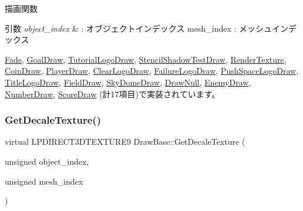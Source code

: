 描画関数 


\begin{DoxyParams}{引数}
{\em object\+\_\+index} & \+: オブジェクトインデックス mesh\+\_\+index \+: メッシュインデックス \\
\hline
\end{DoxyParams}


\mbox{\hyperlink{class_fade_a84a9e688650ac500e03cde74ff0210b8}{Fade}}, \mbox{\hyperlink{class_goal_draw_a554c826d7a4534ee489dfe18edf7ee0e}{Goal\+Draw}}, \mbox{\hyperlink{class_tutorial_logo_draw_aa808cfb8bc59d58bbd698a195603429f}{Tutorial\+Logo\+Draw}}, \mbox{\hyperlink{class_stencil_shadow_test_draw_abb5f9445b7d94c213a3751fa57e36643}{Stencil\+Shadow\+Test\+Draw}}, \mbox{\hyperlink{class_render_texture_a529ab829c676470ae5764b42cba9efb0}{Render\+Texture}}, \mbox{\hyperlink{class_coin_draw_ac7d91fecb6845cebe276eb81a4953563}{Coin\+Draw}}, \mbox{\hyperlink{class_player_draw_a8b9e8caa6bea7295f58a0aaddeb9458b}{Player\+Draw}}, \mbox{\hyperlink{class_clear_logo_draw_ab018f370071f370ae7016d8ee402c456}{Clear\+Logo\+Draw}}, \mbox{\hyperlink{class_failure_logo_draw_a8ee20e1697bbbaf7f41c18334830488a}{Failure\+Logo\+Draw}}, \mbox{\hyperlink{class_push_space_logo_draw_a647dddefc43d66cb3c720ee8fbb6a783}{Push\+Space\+Logo\+Draw}}, \mbox{\hyperlink{class_title_logo_draw_a01e4cb21d580bac86a226fa2e35bf4a3}{Title\+Logo\+Draw}}, \mbox{\hyperlink{class_field_draw_a1915497654d079074dbd3e058db06a78}{Field\+Draw}}, \mbox{\hyperlink{class_sky_dome_draw_a42364ea42618cbab588d55050edfe95a}{Sky\+Dome\+Draw}}, \mbox{\hyperlink{class_draw_null_afe50f6fd820b18d673f70f048743f339}{Draw\+Null}}, \mbox{\hyperlink{class_enemy_draw_a20a23c1c5fd5e510d15e8ca27aabd821}{Enemy\+Draw}}, \mbox{\hyperlink{class_number_draw_a15e4e602b3f9372349d0b6ff9e4fc423}{Number\+Draw}}, \mbox{\hyperlink{class_score_draw_a799e71943140a264cedba6002308b976}{Score\+Draw}} (計17項目)で実装されています。

\mbox{\label{class_draw_base_a4e36184dbb605bcae13bfb38722ddc24}} 
\subsubsection{\texorpdfstring{Get\+Decale\+Texture()}{GetDecaleTexture()}}
{\footnotesize\ttfamily virtual L\+P\+D\+I\+R\+E\+C\+T3\+D\+T\+E\+X\+T\+U\+R\+E9 Draw\+Base\+::\+Get\+Decale\+Texture (\begin{DoxyParamCaption}\item[{unsigned}]{object\+\_\+index,  }\item[{unsigned}]{mesh\+\_\+index }\end{DoxyParamCaption})\hspace{0.3cm}{\ttfamily [pure virtual]}}



